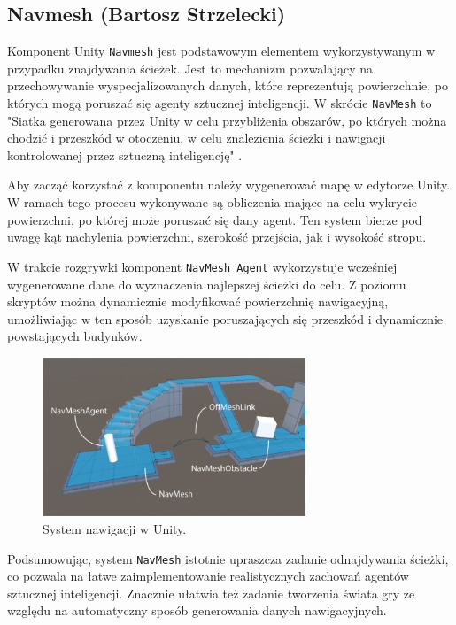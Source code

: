 \subsection{Navmesh (Bartosz Strzelecki)}\label{ss:navmesh}

Komponent Unity \texttt{Navmesh} jest podstawowym elementem wykorzystywanym w przypadku znajdywania ścieżek.
Jest to mechanizm pozwalający na przechowywanie wyspecjalizowanych danych, które reprezentują
powierzchnie, po których mogą poruszać się agenty sztucznej inteligencji.
W skrócie \texttt{NavMesh} to "Siatka generowana przez Unity w celu przybliżenia obszarów, po których można chodzić i przeszkód w
otoczeniu, w celu znalezienia ścieżki i nawigacji kontrolowanej przez sztuczną inteligencję" \cite{unity}.

Aby zacząć korzystać z komponentu należy wygenerować mapę w edytorze Unity.
W ramach tego procesu wykonywane są obliczenia mające na celu wykrycie powierzchni,
po której może poruszać się dany agent. Ten system bierze pod uwagę kąt nachylenia
powierzchni, szerokość przejścia, jak i wysokość stropu.

W trakcie rozgrywki komponent \texttt{NavMesh Agent} wykorzystuje wcześniej wygenerowane dane
do wyznaczenia najlepszej ścieżki do celu. Z poziomu skryptów można dynamicznie modyfikować powierzchnię
nawigacyjną, umożliwiając w ten sposób uzyskanie poruszających się przeszkód i dynamicznie powstających budynków.

\begin{figure}[h!]
    \centering
    \includegraphics[width=0.7\textwidth]{images/navmesh.png}
    \caption{System nawigacji w Unity.}
\end{figure}

Podsumowując, system \texttt{NavMesh} istotnie upraszcza zadanie odnajdywania ścieżki, co pozwala na łatwe zaimplementowanie
realistycznych zachowań agentów sztucznej inteligencji. Znacznie ułatwia też zadanie tworzenia świata gry ze względu na automatyczny
sposób generowania danych nawigacyjnych.

